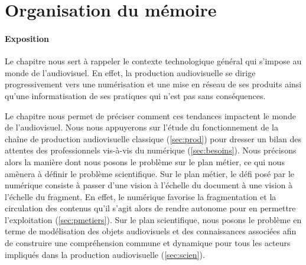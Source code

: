 \section*{Organisation du mémoire}\label{sec:plan}

\paragraph{Exposition}

Le chapitre  nous sert à rappeler le contexte technologique général qui s'impose au monde de l'audiovisuel. 
En effet, la production audiovisuelle se dirige progressivement vers une numérisation et une mise en réseau de ses produits ainsi qu'une informatisation de ses pratiques qui n'est pas sans conséquences. 

Le chapitre  nous permet de préciser comment ces tendances impactent le monde de l'audiovisuel.
Nous nous appuyerons sur l'étude du fonctionnement de la chaîne de production audiovisuelle classique (\ref{sec:prod}) pour dresser un bilan des attentes des professionnels vis-à-vis du numérique (\ref{sec:besoins}).
Nous précisons alors la manière dont nous posons le problème sur le plan métier, ce qui nous amènera à définir le problème scientifique. 
Sur le plan métier, le défi posé par le numérique consiste à passer d'une vision à l'échelle du document à une vision à l'échelle du fragment. 
En effet, le numérique favorise la fragmentation et la circulation des contenus qu'il s'agit alors de rendre autonome pour en permettre l'exploitation (\ref{sec:pmetiers}). 
Sur le plan scientifique, nous posons le problème en terme de modélisation des objets audiovisuels et des connaissances associées afin de construire une compréhension commune et dynamique pour tous les acteurs impliqués dans la production audiovisuelle (\ref{sec:scien}).


